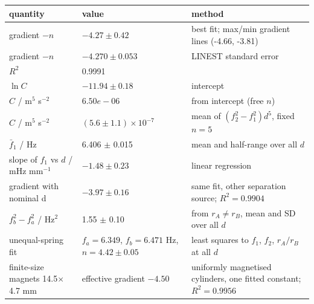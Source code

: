 \begin{tabular}{@{}lll@{}}
\toprule
quantity & value & method \\
\midrule
gradient $-n$ & $-4.27 \pm 0.42$ & best fit; max/min gradient lines (-4.66, -3.81) \\
gradient $-n$ & $-4.270 \pm 0.053$ & LINEST standard error \\
$R^2$ & 0.9991 & \\
$\ln C$ & $-11.94 \pm 0.18$ & intercept \\
$C$ / m$^5$ s$^{-2}$ & $6.50e-06$ & from intercept (free $n$) \\
$C$ / m$^5$ s$^{-2}$ & $(5.6 \pm 1.1)\times 10^{-7}$ & mean of $(f_2^2-f_1^2)d^5$, fixed $n=5$ \\
$\bar f_1$ / Hz & 6.406 $\pm$ 0.015 & mean and half-range over all $d$ \\
slope of $f_1$ vs $d$ / mHz mm$^{-1}$ & $-1.48 \pm 0.23$ & linear regression \\
gradient with nominal d & $-3.97 \pm 0.16$ & same fit, other separation source; $R^2=0.9904$ \\
$f_b^2-f_a^2$ / Hz$^2$ & 1.55 $\pm$ 0.10 & from $r_A\neq r_B$, mean and SD over all $d$ \\
unequal-spring fit & $f_a=6.349$, $f_b=6.471$ Hz, $n=4.42\pm0.05$ & least squares to $f_1$, $f_2$, $r_A/r_B$ at all $d$ \\
finite-size magnets 14.5$\times$4.7 mm & effective gradient $-4.50$ & uniformly magnetised cylinders, one fitted constant; $R^2=0.9956$ \\
\bottomrule
\end{tabular}